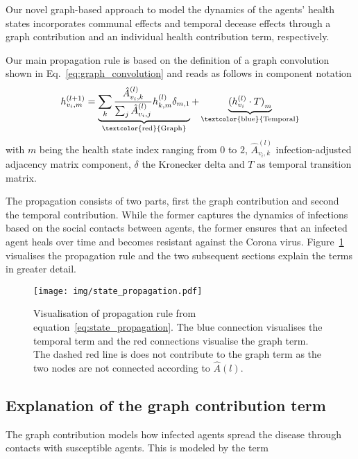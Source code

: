 
Our novel graph-based approach to model the dynamics of the agents' health states incorporates communal effects and temporal decease effects through a graph contribution and an individual health contribution term, respectively.

Our main propagation rule is based on the definition of a graph convolution shown in Eq.~\eqref{eq:graph_convolution} and reads as follows in component notation
\begin{equation}
	\label{eq:state_propagation}
	h_{v_i, m}^{(l+1)}
	=
	\underbrace{
		\sum_k \frac{\hat{A}_{v_i, k}^{(l)}}{\sum_j \hat{A}_{v_i, j}^{(l)}} h_{k, m}^{(l)} \delta_{m, 1}
	}_{\text{\textcolor{red}{Graph}}}
	+
	\underbrace{
		{(h_{v_i}^{(l)}\cdot T)}_m
	}_{\text{\textcolor{blue}{Temporal}}}
\end{equation}
with $m$ being the health state index ranging from $0$ to $2$, $\hat{A}_{v_i, k}^{(l)}$ infection-adjusted adjacency matrix component, $\delta$ the Kronecker delta and $T$ as temporal transition matrix.

The propagation consists of two parts, first the graph contribution and second the temporal contribution. While the former captures the dynamics of infections based on the social contacts between agents, the former ensures that an infected agent heals over time and becomes resistant against the Corona virus. Figure~\ref{fig:state_propagation} visualises the propagation rule and the two subsequent sections explain the terms in greater detail.

\begin{figure}[H]
	\centering
	\texttt{[image: img/state\_propagation.pdf]}
	\caption{Visualisation of propagation rule from equation~\eqref{eq:state_propagation}. The blue connection visualises the temporal term and the red connections visualise the graph term. The dashed red line is does not contribute to the graph term as the two nodes are not connected according to $\hat{A}(l)$.}%
	\label{fig:state_propagation}
\end{figure}

\subsection{Explanation of the graph contribution term}

The graph contribution models how infected agents spread the disease through contacts with susceptible agents. This is modeled by the term

